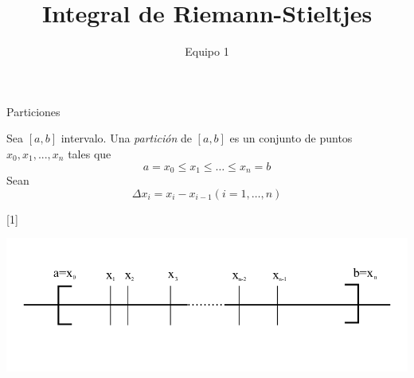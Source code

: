 \documentclass[11pt]{beamer}
\author{Equipo 1}
\title{Integral de Riemann-Stieltjes}
\institute{Facultad de Matemáticas UV}
\begin{document}
\begin{frame}
\titlepage
\end{frame}


\begin{frame}{Particiones}

\begin{definition}
Sea $[a, b]$ intervalo. Una \textit{partición} de $[a, b]$ es un conjunto de puntos $x_0, x_1,..., x_n$ tales que
\begin{equation*}
	a = x_0 \leq x_1 \leq \dots \leq x_n = b
\end{equation*}
Sean
\begin{equation*}
	\Delta x_i = x_i - x_{i-1} (i = 1, \dots, n)
\end{equation*}
\end{definition}[1]

\begin{center}
\includegraphics[scale=1]{img/particion.png}
\end{center}

\end{frame}
\end{document}
